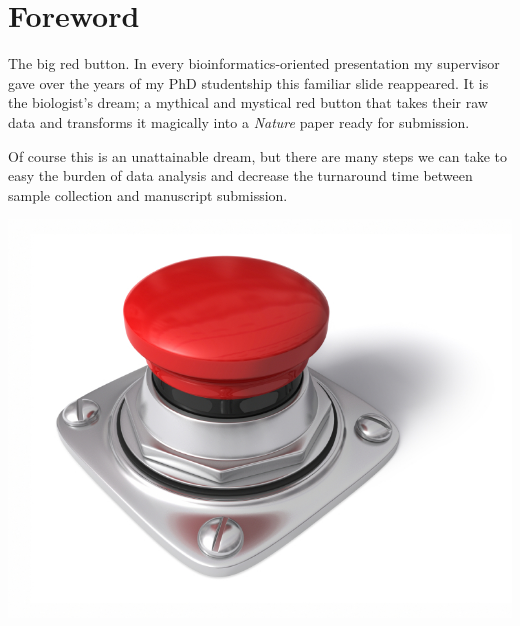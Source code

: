 \chapter*{Foreword}
{}
\setlength\parindent{0pt}
\vspace{-1cm}
The big red button. In every bioinformatics-oriented presentation my supervisor gave over the years of my PhD studentship this familiar slide reappeared.
It is the biologist's dream; a mythical and mystical red button that takes their raw data and transforms it magically into a \emph{Nature} paper ready for submission.


Of course this is an unattainable dream, but there are many steps we can take to easy the burden of data analysis and decrease the
turnaround time between sample collection and manuscript submission.

\begin{center}
\includegraphics[scale=0.25]{chapters/images/redbutton.jpg}
\end{center}
